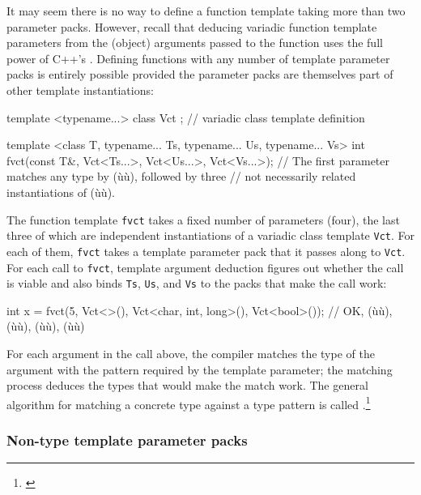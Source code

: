 It may seem there is no way to define a function template taking more
than two parameter packs. However, recall that deducing variadic
function template parameters from the (object) arguments passed to the
function uses the full power of C++'s . Defining functions with any number of template parameter
packs is entirely possible provided the parameter packs are themselves
part of other template instantiations:

\begin{emcppslisting}
template <typename...> class Vct { };  // variadic class template definition

template <class T, typename... Ts, typename... Us, typename... Vs>
int fvct(const T&, Vct<Ts...>, Vct<Us...>, Vct<Vs...>);
    // The first parameter matches any type by (ù{}ù), followed by three
    // not necessarily related instantiations of (ù{}ù).
\end{emcppslisting}
    

\noindent The function template \lstinline!fvct! takes a fixed number of parameters
(four), the last three of which are independent instantiations of a
variadic class template \lstinline!Vct!. For each of them, \lstinline!fvct!
takes a template parameter pack that it passes along to \lstinline!Vct!.
For each call to \lstinline!fvct!, template argument deduction figures out
whether the call is viable and also binds \lstinline!Ts!, \lstinline!Us!, and
\lstinline!Vs! to the packs that make the call work:

\begin{emcppslisting}
int x = fvct(5, Vct<>(), Vct<char, int, long>(), Vct<bool>());
    // OK, (ù{}ù), (ù{}ù), (ù{}ù), (ù{}ù)
\end{emcppslisting}
    

\noindent For each argument in the call above, the compiler matches the type of
the argument with the pattern required by the template parameter; the
matching process deduces the types that would make the match work. The
general algorithm for matching a concrete type against a type pattern is
called .{\cprotect\footnote{\cite{bendersky18}}}

\subsubsection[Non-type template parameter packs]{Non-type template parameter packs}\label{non-type-template-parameter-packs}

